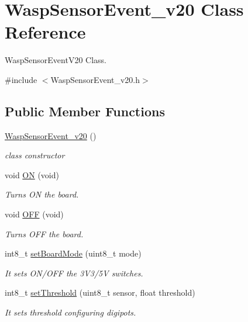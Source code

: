 \hypertarget{class_wasp_sensor_event__v20}{}\section{Wasp\+Sensor\+Event\+\_\+v20 Class Reference}
\label{class_wasp_sensor_event__v20}


Wasp\+Sensor\+Event\+V20 Class.  




{\ttfamily \#include $<$Wasp\+Sensor\+Event\+\_\+v20.\+h$>$}

\subsection*{Public Member Functions}
\begin{DoxyCompactItemize}
\item 
\hyperlink{class_wasp_sensor_event__v20_ac36e9b631e982cf5c86d0d06d1081a0d}{Wasp\+Sensor\+Event\+\_\+v20} ()
\begin{DoxyCompactList}\small\item\em class constructor \end{DoxyCompactList}\item 
void \hyperlink{class_wasp_sensor_event__v20_aaa1a2db3cc3f660d2645721c96ce3cb5}{ON} (void)
\begin{DoxyCompactList}\small\item\em Turns ON the board. \end{DoxyCompactList}\item 
void \hyperlink{class_wasp_sensor_event__v20_a8847c124d3c49f9004d986fb63c0c5bf}{O\+FF} (void)
\begin{DoxyCompactList}\small\item\em Turns O\+FF the board. \end{DoxyCompactList}\item 
int8\+\_\+t \hyperlink{class_wasp_sensor_event__v20_af4eb926dd1f9b820a47551f1caa4ee60}{set\+Board\+Mode} (uint8\+\_\+t mode)
\begin{DoxyCompactList}\small\item\em It sets O\+N/\+O\+FF the 3\+V3/5V switches. \end{DoxyCompactList}\item 
int8\+\_\+t \hyperlink{class_wasp_sensor_event__v20_ab66fc54464f591e08e48634565ce8003}{set\+Threshold} (uint8\+\_\+t sensor, float threshold)
\begin{DoxyCompactList}\small\item\em It sets threshold configuring digipots. \end{DoxyCompactList}\item 

\end{DoxyCompactItemize}
